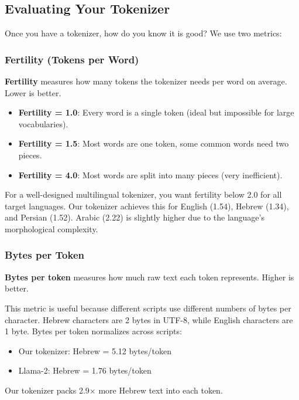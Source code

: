 \documentclass[11pt,a4paper]{article}
\begin{document}
\subsection{Evaluating Your Tokenizer}

Once you have a tokenizer, how do you know it is good? We use two metrics:

\subsubsection{Fertility (Tokens per Word)}

\textbf{Fertility} measures how many tokens the tokenizer needs per word on average. Lower is better.

\begin{itemize}
    \item \textbf{Fertility = 1.0}: Every word is a single token (ideal but impossible for large vocabularies).
    \item \textbf{Fertility = 1.5}: Most words are one token, some common words need two pieces.
    \item \textbf{Fertility = 4.0}: Most words are split into many pieces (very inefficient).
\end{itemize}

For a well-designed multilingual tokenizer, you want fertility below 2.0 for all target languages. Our tokenizer achieves this for English (1.54), Hebrew (1.34), and Persian (1.52). Arabic (2.22) is slightly higher due to the language's morphological complexity.

\subsubsection{Bytes per Token}

\textbf{Bytes per token} measures how much raw text each token represents. Higher is better.

This metric is useful because different scripts use different numbers of bytes per character. Hebrew characters are 2 bytes in UTF-8, while English characters are 1 byte. Bytes per token normalizes across scripts:

\begin{itemize}
    \item Our tokenizer: Hebrew = 5.12 bytes/token
    \item Llama-2: Hebrew = 1.76 bytes/token
\end{itemize}

Our tokenizer packs 2.9$\times$ more Hebrew text into each token.
\end{document}
